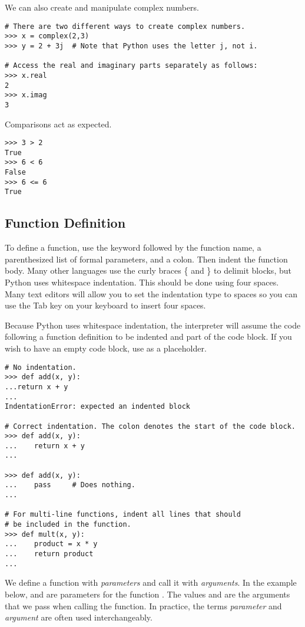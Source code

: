 We can also create and manipulate complex numbers.
\begin{lstlisting}
# There are two different ways to create complex numbers.
>>> x = complex(2,3)
>>> y = 2 + 3j	# Note that Python uses the letter j, not i.

# Access the real and imaginary parts separately as follows:
>>> x.real
2
>>> x.imag
3
\end{lstlisting}

Comparisons act as expected.
\begin{lstlisting}
>>> 3 > 2
True
>>> 6 < 6
False
>>> 6 <= 6
True
\end{lstlisting}


\subsection*{Function Definition}
To define a function, use the  keyword followed by the function name, a parenthesized list of formal parameters, and a colon.
Then indent the function body.
Many other languages use the curly braces \{ and \} to delimit blocks, but Python uses whitespace indentation.
This should be done using four spaces.
Many text editors will allow you to set the indentation type to spaces so you can use the Tab key on your keyboard to insert four spaces.

Because Python uses whitespace indentation, the interpreter will assume the code following a function definition to be indented and part of the code block.
If you wish to have an empty code block, use  as a placeholder.
\begin{lstlisting}
# No indentation.
>>> def add(x, y):
...return x + y
...
IndentationError: expected an indented block

# Correct indentation. The colon denotes the start of the code block.
>>> def add(x, y):
...    return x + y
...

>>> def add(x, y):
...    pass		# Does nothing.
...

# For multi-line functions, indent all lines that should
# be included in the function.
>>> def mult(x, y):
...    product = x * y
...    return product
...
\end{lstlisting}

We define a function with \emph{parameters} and call it with \emph{arguments}. In the example below,  and  are parameters for the function . The values  and  are the arguments that we pass when calling the function. In practice, the terms \emph{parameter} and \emph{argument} are often used interchangeably.

